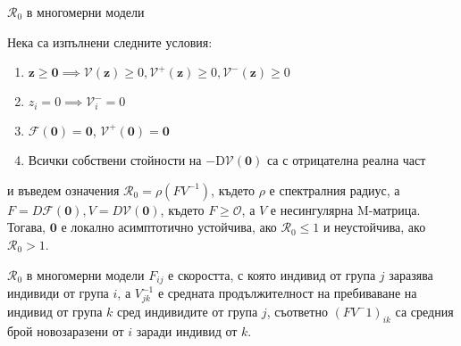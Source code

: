 \begin{frame}[t]{$\mathscr{R}_0$ в многомерни модели}
  \begin{theorem}
    Нека са изпълнени следните условия:
    \begin{enumerate}
      \item $\boldsymbol{z} \geq \boldsymbol{0} \implies \mathscr{V}(\boldsymbol{z}) \geq 0, \mathscr{V}^+(\boldsymbol{z}) \geq 0, \mathscr{V}^-(\boldsymbol{z}) \geq 0$
      \item $z_i = 0 \implies \mathscr{V}_{i}^- = 0$
      \item $\mathscr{F}(\boldsymbol{0}) = \boldsymbol{0}$, $\mathscr{V}^+(\boldsymbol{0}) = \boldsymbol{0}$
      \item Всички собствени стойности на $-\mathrm{D}\mathscr{V}{(\boldsymbol{0})}$ са с отрицателна реална част
    \end{enumerate}
    и въведем означения $\mathscr{R}_0 = \rho(F V^{-1})$, където $\rho$ е спектралния радиус, а $F = D\mathscr{F}(\boldsymbol{0}), V = D\mathscr{V}(\boldsymbol{0})$, където $F \geq \mathscr{O}$, а $V$ е несингулярна M-матрица. \\
    Тогава, $\boldsymbol{0}$ е локално асимптотично устойчива, ако $\mathscr{R}_0 \leq 1$ и неустойчива, ако $\mathscr{R}_0 > 1$.
  \end{theorem}
\end{frame}

\begin{frame}[t]{$\mathscr{R}_0$ в многомерни модели}
  $F_{ij}$ е скоростта, с която индивид от група $j$ заразява индивиди от група $i$, а $V^{-1}_{jk}$ е средната продължителност на пребиваване на индивид от група $k$ сред индивидите от група $j$, съответно $(F V^-1)_{ik}$ са средния брой новозаразени от $i$ заради индивид от $k$.
\end{frame}
